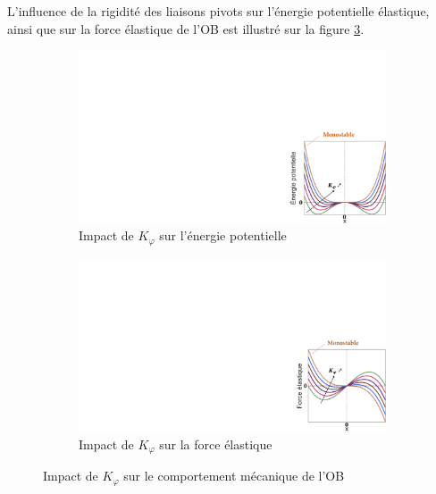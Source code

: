 L'influence de la rigidité des liaisons pivots sur l'énergie potentielle élastique, ainsi que sur la force élastique de l'OB est illustré sur la figure \ref{fig:impact_Kphi}.
\begin{figure}[!htbp]
\begin{center}
	\begin{subfigure}[b]{0.4\textwidth}
    	\captionsetup{justification=centering}
		\includegraphics[trim={23cm 0cm 0cm 9cm},clip,width=\textwidth]{../Chap2/Figure/Kphi_Ep.pdf}
		\caption{Impact de $K_{\varphi}$ sur l'énergie potentielle}
		\label{fig:Kphi_Ep}
	\end{subfigure}
\hfillx
	\begin{subfigure}[b]{0.38\textwidth}
    	\captionsetup{justification=centering}
		\includegraphics[trim={24cm 0cm 0cm 9cm},clip,width=\textwidth]{../Chap2/Figure/Kphi_Felas.pdf}
		\caption{Impact de $K_{\varphi}$ sur la force élastique}
		\label{fig:Kphi_Felas}  
	\end{subfigure}
	\caption{Impact de $K_{\varphi}$ sur le comportement mécanique de l'OB}
	\label{fig:impact_Kphi}
\end{center}	
\end{figure}

